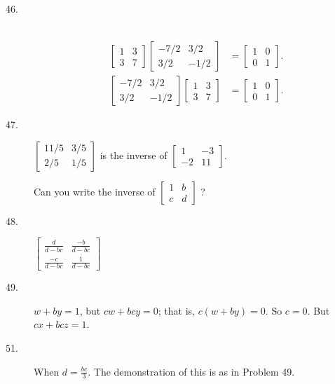 \documentclass{article}
\begin{document}
\begin{description}
  \item[46.] $\ $
    \begin{align*}
      \begin{bmatrix} 1 & 3 \\ 3 & 7 \end{bmatrix}
        \begin{bmatrix} -7/2 & 3/2 \\ 3/2 & -1/2 \end{bmatrix}
        & = \begin{bmatrix} 1 & 0 \\ 0 & 1 \end{bmatrix}. \\
      \begin{bmatrix} -7/2 & 3/2 \\ 3/2 & -1/2 \end{bmatrix}
        \begin{bmatrix} 1 & 3 \\ 3 & 7 \end{bmatrix} 
        & = \begin{bmatrix} 1 & 0 \\ 0 & 1 \end{bmatrix}.
    \end{align*}

  \item[47.] $\begin{bmatrix} 11/5 & 3/5 \\ 2/5 & 1/5 \end{bmatrix}$ is the inverse of $\begin{bmatrix} 1 & -3 \\ -2 & 11 \end{bmatrix}$.

    Can you write the inverse of $\begin{bmatrix} 1 & b \\ c & d \end{bmatrix}$ ? 

  \item[48.] $\begin{bmatrix} \frac{d}{d-bc} & \frac{-b}{d-bc} \\ \frac{-c}{d-bc} & \frac{1}{d-bc} \end{bmatrix}$

  \item[49.] $w + by = 1$, but $cw + bcy = 0$; that is, $c(w+by) = 0$. So $c=0$. But $cx + bcz = 1$.

  \item[51.] When $d = \frac{bc}{3}$. The demonstration of this is as in Problem 49. 


\end{description}
\end{document}
